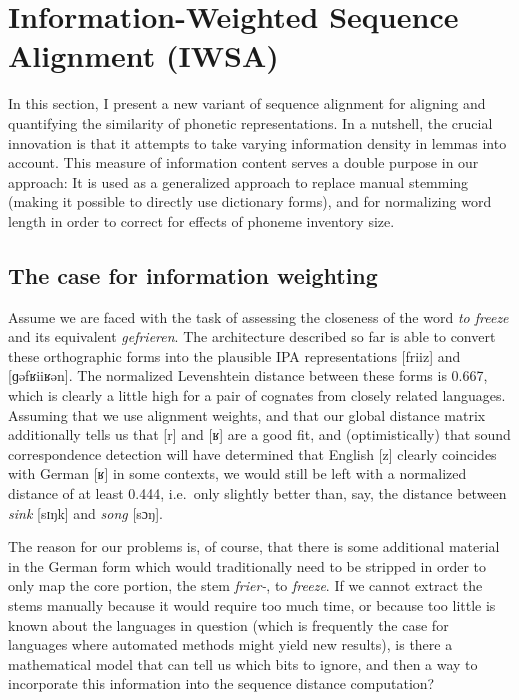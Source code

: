 \normalsize
\section{Information-Weighted Sequence Alignment (IWSA)}\label{sec:4.3}
In this section, I present a new variant of sequence alignment for aligning and quantifying the similarity of phonetic representations. In a nutshell, the crucial innovation is that it attempts to take varying information density in lemmas into account. This measure of information content serves a double purpose in our approach: It is used as a generalized approach to replace manual stemming (making it possible to directly use dictionary forms), and for normalizing word length in order to correct for effects of phoneme inventory size.

\subsection{The case for information weighting}\label{sec:4.3.1}
Assume we are faced with the task of assessing the closeness of the  word \textit{to freeze} and its  equivalent \textit{gefrieren}. The architecture described so far is able to convert these orthographic forms into the plausible IPA representations [friiz] and [ɡəfʁiiʁən]. The normalized Levenshtein distance between these forms is 0.667, which is clearly a little high for a pair of cognates from closely related languages. Assuming that we use alignment weights, and that our global distance matrix additionally tells us that [r] and [ʁ] are a good fit, and (optimistically) that sound correspondence detection will have determined that English [z] clearly coincides with German [ʁ] in some contexts, we would still be left with a normalized distance of at least 0.444, i.e.\ only slightly better than, say, the distance between \textit{sink} [sɪŋk] and \textit{song} [sɔŋ].

The reason for our problems is, of course, that there is some additional material in the German form which would traditionally need to be stripped in order to only map the core portion, the stem \textit{frier-}, to \textit{freeze}. If we cannot extract the stems manually because it would require too much time, or because too little is known about the languages in question (which is frequently the case for languages where automated methods might yield new results), is there a mathematical model that can tell us which bits to ignore, and then a way to incorporate this information into the sequence distance computation?

